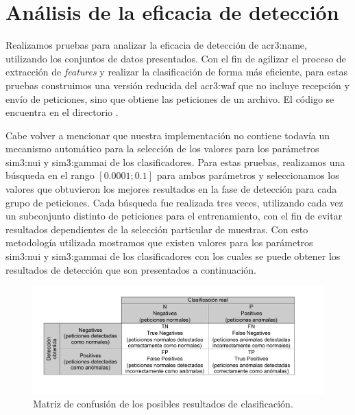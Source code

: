 \section{Análisis de la eficacia de detección}

Realizamos pruebas para analizar la eficacia de detección de \gls{acr3:name},
utilizando los conjuntos de datos presentados. Con el fin de agilizar el
proceso de extracción de \textit{features} y realizar la clasificación
de forma más eficiente, para estas pruebas construimos una versión
reducida del \gls{acr3:waf} que no incluye recepción y envío de peticiones,
sino que obtiene las peticiones de un archivo. El código se encuentra en
el directorio .

Cabe volver a mencionar que nuestra implementación no contiene todavía
un mecanismo automático para la selección de los valores para los parámetros
\gls{sim3:nui} y \gls{sim3:gammai} de los clasificadores. Para estas
pruebas, realizamos una búsqueda en el rango $[\num{0.0001} ; \num{0.1}]$
para ambos parámetros y seleccionamos los valores que obtuvieron los
mejores resultados en la fase de detección para cada grupo de peticiones.
Cada búsqueda fue realizada tres veces, utilizando cada vez un subconjunto
distinto de peticiones para el entrenamiento, con el fin de evitar resultados
dependientes de la selección particular de muestras.
Con esto metodología utilizada mostramos que existen valores para los
parámetros \gls{sim3:nui} y \gls{sim3:gammai} de los clasificadores con
los cuales se puede obtener los resultados de detección que son presentados
a continuación.

\begin{figure}[th]
    \centering
    \includegraphics[width=\linewidth, trim=1.1cm 1.7cm 1.6cm 1cm]{images/diagram-score-explanation.pdf}

    \caption{Matriz de confusión de los posibles resultados de clasificación.}
    \label{fig:res:score_explanation}
\end{figure}


